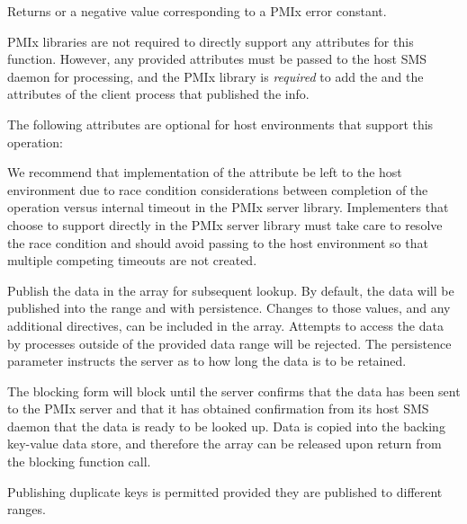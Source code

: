 Returns  or a negative value corresponding to a PMIx error constant.

\reqattrstart
\ac{PMIx} libraries are not required to directly support any attributes for this function. However, any provided attributes must be passed to the host \ac{SMS} daemon for processing, and the \ac{PMIx} library is \textit{required} to add the  and the  attributes of the client process that published the info.

\reqattrend

\optattrstart
The following attributes are optional for host environments that support this operation:


\optattrend

\adviceimplstart
We recommend that implementation of the  attribute be left to the host environment due to race condition considerations between completion of the operation versus internal timeout in the \ac{PMIx} server library. Implementers that choose to support  directly in the \ac{PMIx} server library must take care to resolve the race condition and should avoid passing  to the host environment so that multiple competing timeouts are not created.
\adviceimplend

\descr

Publish the data in the  array for subsequent lookup.
By default, the data will be published into the  range and with  persistence.
Changes to those values, and any additional directives, can be included in the  array. Attempts to access the data by processes outside of the provided data range will be rejected. The persistence parameter instructs the server as to how long the data is to be retained.

The blocking form will block until the server confirms that the data has been sent to the \ac{PMIx} server and that it has obtained confirmation from its host \ac{SMS} daemon that the data is ready to be looked up. Data is copied into the backing key-value data store, and therefore the  array can be released upon return from the blocking function call.

\adviceuserstart
Publishing duplicate keys is permitted provided they are published to different ranges.
\adviceuserend

